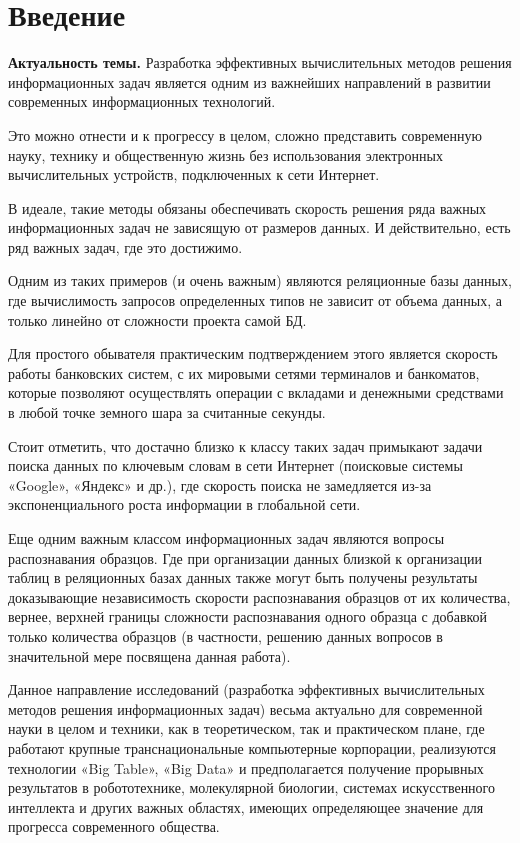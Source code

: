 \chapter*{Введение}							%

\textbf{Актуальность темы.}  Разработка эффективных вычислительных  методов решения информационных задач является одним из важнейших направлений в развитии современных информационных технологий.

Это можно отнести и к прогрессу в целом, сложно представить современную науку, технику  и общественную жизнь без использования электронных вычислительных устройств, подключенных к сети Интернет.

В идеале, такие методы обязаны обеспечивать скорость решения ряда важных информационных задач не зависящую от размеров данных. И действительно, есть ряд важных задач, где это достижимо. 

Одним из таких примеров (и очень важным) являются реляционные базы данных, где вычислимость запросов определенных типов не зависит от объема данных, а только линейно от сложности проекта самой БД.

Для простого обывателя практическим подтверждением этого является скорость работы банковских систем, с их мировыми сетями терминалов и банкоматов, которые позволяют осуществлять операции с вкладами и денежными средствами в любой точке земного шара за считанные секунды.

Стоит отметить, что достачно близко к классу таких задач примыкают задачи поиска данных по ключевым словам в сети Интернет (поисковые системы «Google», «Яндекс» и др.), где скорость поиска не замедляется из-за экспоненциального роста информации в глобальной сети.

Еще одним важным классом информационных задач являются вопросы распознавания образцов. Где при организации данных близкой к организации таблиц в реляционных базах данных также могут быть получены результаты доказывающие независимость скорости  распознавания  образцов от их количества, вернее, верхней границы сложности распознавания одного образца с добавкой только количества образцов (в частности, решению данных вопросов в значительной мере посвящена данная работа). 

Данное направление исследований (разработка эффективных вычислительных  методов решения информационных задач) весьма актуально для современной  науки в целом и техники, как в теоретическом, так и  практическом плане, где работают крупные транснациональные компьютерные корпорации, реализуются технологии «Big Table»,  «Big Data» и предполагается получение прорывных результатов в робототехнике, молекулярной биологии, системах искусственного интеллекта и других важных областях, имеющих определяющее значение для прогресса современного общества.

